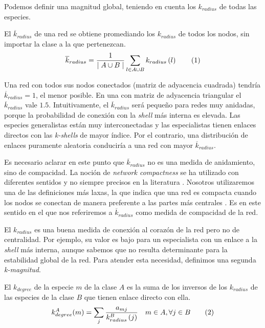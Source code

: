 Podemos definir una magnitud global, teniendo en cuenta los $k_{radius}$ de todas las especies.

\begin{theo} 
El \textit{$\overline k_{radius}$} de una red se obtiene promediando los ${k}_{radius}$ de todos los nodos, sin importar la clase a la que pertenezcan.
\begin{align*}
\displaystyle
\overline {k}_{radius} = \frac{1}{\mid A \cup B \mid}\sum\limits_{l \in A \cup B} k_{radius}\left(l\right)
\stepcounter{equation}\tag{\theequation}\label{avgkradius}
\end{align*}
\label{ESTATICA_avgkradius}
\end{theo}

Una red con todos sus nodos conectados (matriz de adyacencia cuadrada) tendría $\overline {k}_{radius}=1$, el menor posible. En una con matriz de adyacencia triangular el $\overline {k}_{radius}$ vale $1.5$. Intuitivamente, el $\overline {k}_{radius}$ será pequeño para redes muy anidadas, porque la probabilidad de conexión con la \textit{shell} más interna es elevada. Las especies generalistas están muy interconectadas y las especialistas tienen enlaces directos con las \textit{k-shells} de mayor índice. Por el contrario, una distribución de enlaces puramente aleatoria conduciría a una red con mayor $\overline {k}_{radius}$.

Es necesario aclarar en este punto que $\overline {k}_{radius}$ no es una medida de anidamiento, sino de compacidad. La noción de \textit{network compactness} se ha utilizado con diferentes sentidos y no siempre precisos en la literatura \cite{wagner2003does, egghe2003measure, chapanond2005graph, zhang2011constructing}. Nosotros utilizaremos una de las definiciones más laxas, la que indica que una red es compacta cuando los nodos se conectan de manera preferente a las partes más centrales \cite{alava2004preferential}. Es en este sentido en el que nos referiremos a $\overline {k}_{radius}$ como medida de compacidad de la red.

El ${k}_{radius}$ es una buena medida de conexión al corazón de la red pero no de centralidad. Por ejemplo, su valor es bajo para un especialista con un enlace a la \textit{shell} más interna, aunque sabemos que no resulta determinante para la estabilidad global de la red. Para atender esta necesidad, definimos una segunda \textit{k-magnitud}.

\begin{theo} 
El \textit{$k_{degree}$} de la especie $m$ de la clase $A$ es la suma de los inversos de los $k_{radius}$ de las especies de la clase $B$ que tienen enlace directo con ella.
\begin{align*}
\displaystyle
k^A_{degree}(m) = \sum\limits_{j} \frac{a_{mj} }{k^B_{radius}\left(j\right)}  \quad   m \in A, \forall j \in B
\stepcounter{equation}\tag{\theequation}
\end{align*}
\label{kdegree}
\end{theo}

